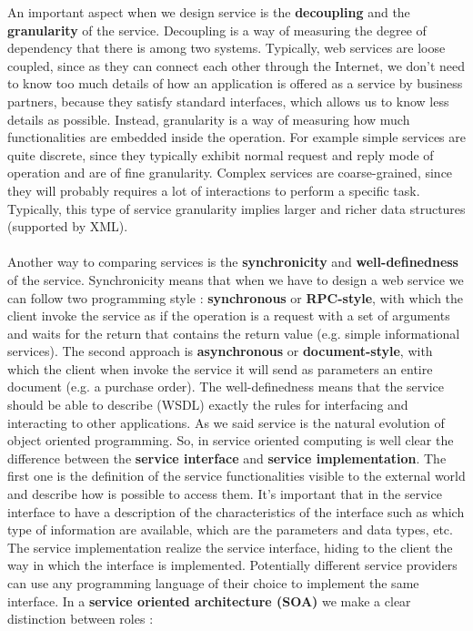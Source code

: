 An important aspect when we design service is the \textbf{decoupling} and the \textbf{granularity} of the service. Decoupling is a way of measuring the degree of dependency that there is among two systems. Typically, web services are loose coupled, since as they can connect each other through the Internet, we don't need to know too much details of how an application is offered as a service by business partners, because they satisfy standard interfaces, which allows us to know less details as possible. Instead, granularity is a way of measuring how much functionalities are embedded inside the operation. For example simple services are quite discrete, since they typically exhibit normal request and reply mode of operation and are of fine granularity. Complex services are coarse-grained, since they will probably requires a lot of interactions to perform a specific task. Typically, this type of service granularity implies larger and richer data structures (supported by XML).\\\\Another way to comparing services is the \textbf{synchronicity} and \textbf{well-definedness} of the service. Synchronicity means that when we have to design a web service we can follow two programming style : \textbf{synchronous} or \textbf{RPC-style}, with which the client invoke the service as if the operation is a request with a set of arguments and waits for the return that contains the return value (e.g. simple informational services). The second approach is \textbf{asynchronous} or \textbf{document-style}, with which the client when invoke the service it will send as parameters an entire document (e.g. a purchase order). The well-definedness means that the service should be able to describe (WSDL) exactly the rules for interfacing and interacting to other applications. As we said service is the natural evolution of object oriented programming. So, in service oriented computing is well clear the difference between the \textbf{service interface} and \textbf{service implementation}. The first one is the definition of the service functionalities visible to the external world and describe how is possible to access them. It's important that in the service interface to have a description of the characteristics of the interface such as which type of information are available, which are the parameters and data types, etc. The service implementation realize the service interface, hiding to the client the way in which the interface is implemented. Potentially different service providers can use any programming language of their choice to implement the same interface. In a \textbf{service oriented architecture (SOA)} we make a clear distinction between roles :
